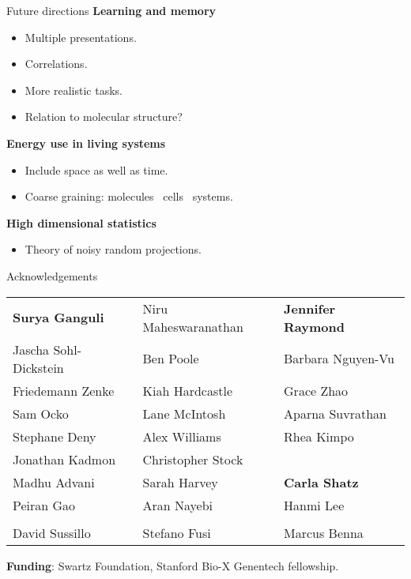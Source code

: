 \documentclass[final]{beamer}%
\begin{document}
\begin{frame}{Future directions}
%
 \textbf{Learning and memory}
 \begin{itemize}
   \item Multiple presentations.
   \item Correlations.
   \item More realistic tasks.
   \item Relation to molecular structure?
 \end{itemize}

 \vp\textbf{Energy use in living systems}
 \begin{itemize}
   \item Include space as well as time.
   \item Coarse graining: molecules \lto\ cells \lto\ systems.
 \end{itemize}

 \vp\textbf{High dimensional statistics}
 \begin{itemize}
   \item Theory of noisy random projections.
 \end{itemize}
%
\end{frame}


\begin{frame}{Acknowledgements}
%
\begin{tabular}{lll}
  \textbf{Surya Ganguli} & Niru Maheswaranathan & \textbf{Jennifer Raymond} \\
  Jascha Sohl-Dickstein  & Ben Poole            & \alert{Barbara Nguyen-Vu} \\
  Friedemann Zenke       & Kiah Hardcastle      & \alert{Grace Zhao}        \\
  Sam Ocko               & Lane McIntosh        & Aparna Suvrathan          \\
  Stephane Deny          & Alex Williams        & Rhea Kimpo                \\
  Jonathan Kadmon        & Christopher Stock    \\
  Madhu Advani           & Sarah Harvey         & \textbf{Carla Shatz}      \\
  Peiran Gao             & Aran Nayebi          & Hanmi Lee                 \\
  \\
  David Sussillo         & Stefano Fusi         & Marcus Benna    \\
\end{tabular}

 \vp\textbf{Funding}: Swartz Foundation, Stanford Bio-X Genentech fellowship.

%
\end{frame}
\end{document}
